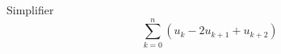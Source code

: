 Simplifier
\begin{displaymath}
  \sum_{k=0}^{n}\left( u_k -2u_{k+1} +u_{k+2}\right) 
\end{displaymath}
\bigskip